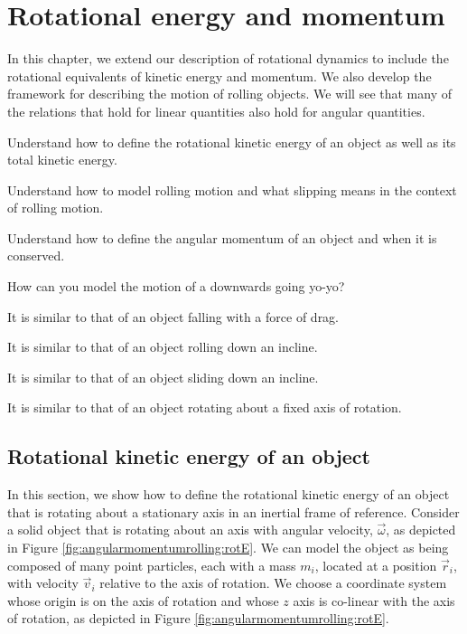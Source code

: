 \chapter{Rotational energy and momentum}
\label{chapter:angularmomentumrolling}
In this chapter, we extend our description of rotational dynamics to include the rotational equivalents of kinetic energy and momentum. We also develop the framework for describing the motion of rolling objects. We will see that many of the relations that hold for linear quantities also hold for angular quantities. 

\begin{learningObjectives}{
 \item Understand how to define the rotational kinetic energy of an object as well as its total kinetic energy.
 \item Understand how to model rolling motion and what slipping means in the context of rolling motion.
 \item Understand how to define the angular momentum of an object and when it is conserved.
 }
\end{learningObjectives}

\begin{opening}
\begin{MCquestion}{How can you model the motion of a downwards going yo-yo?}
\item It is similar to that of an object falling with a force of drag.
\item It is similar to that of an object rolling down an incline. \correct
\item It is similar to that of an object sliding down an incline.
\item It is similar to that of an object rotating about a fixed axis of rotation.
\end{MCquestion}
\end{opening}

\section{Rotational kinetic energy of an object}
In this section, we show how to define the rotational kinetic energy of an object that is rotating about a stationary axis in an inertial frame of reference. Consider a solid object that is rotating about an axis with angular velocity, $\vec\omega$, as depicted in Figure \ref{fig:angularmomentumrolling:rotE}.
We can model the object as being composed of many point particles, each with a mass $m_i$, located at a position $\vec r_i$, with velocity $\vec v_i$ relative to the axis of rotation. We choose a coordinate system whose origin is on the axis of rotation and whose $z$ axis is co-linear with the axis of rotation, as depicted in Figure \ref{fig:angularmomentumrolling:rotE}.

